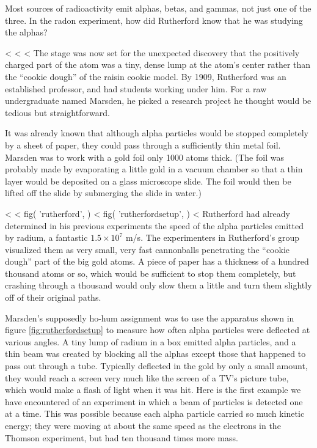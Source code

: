 \startdq
\begin{dq}
        Most sources of radioactivity emit alphas, betas, and
        gammas, not just one of the three. In the radon experiment,
        how did Rutherford know that he was studying the alphas?
\end{dq}
    <%
  <%
  <%
        The stage was now set for the unexpected discovery that the
        positively charged part of the atom was a tiny, dense lump
        at the atom's center rather than the ``cookie dough'' of the
        raisin cookie model. By 1909, Rutherford was an established
        professor, and had students working under him. For a raw
        undergraduate named Marsden, he picked a research project he
        thought would be tedious but straightforward.

        It was already known that although alpha particles would be
        stopped completely by a sheet of paper, they could pass
        through a sufficiently thin metal foil. Marsden was to work
        with a gold foil only 1000 atoms thick. (The foil was
        probably made by evaporating a little gold in a vacuum
        chamber so that a thin layer would be deposited on a glass
        microscope slide. The foil would then be lifted off the
        slide by submerging the slide in water.) 

<%
<%
  fig(
    'rutherford',
  )
\spacebetweenfigs
<%
  fig(
    'rutherfordsetup',
  )
<%
        Rutherford had already determined in his previous experiments
        the speed of the alpha particles emitted by radium, a
        fantastic $1.5\times10^7$  m/s. The experimenters in
        Rutherford's group visualized them as very small, very fast
        cannonballs penetrating the ``cookie dough'' part of the big
        gold atoms. A piece of paper has a thickness of a hundred
        thousand atoms or so, which would be sufficient to stop them
        completely, but crashing through a thousand would only slow
        them a little and turn them slightly off of their original paths. 

        Marsden's supposedly ho-hum assignment was to use the
        apparatus shown in figure \ref{fig:rutherfordsetup} to measure how often alpha
        particles were deflected at various angles. A tiny lump of
        radium in a box emitted alpha particles, and a thin beam was
        created by blocking all the alphas except those that
        happened to pass out through a tube. Typically deflected in
        the gold by only a small amount, they would reach a screen
        very much like the screen of a TV's picture tube, which
        would make a flash of light when it was hit. Here is the
        first example we have encountered of an experiment in which
        a beam of particles is detected one at a time. This was
        possible because each alpha particle carried so much kinetic
        energy; they were moving at about the same speed as the
        electrons in the Thomson experiment, but had ten thousand times more mass.

